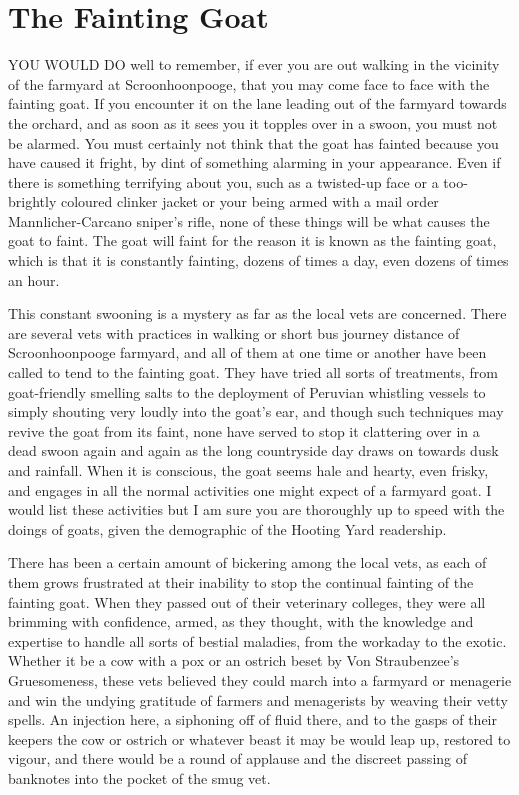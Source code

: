 \chapter{The Fainting Goat}

YOU WOULD DO well to remember, if ever you are out walking in the vicinity of the farmyard at Scroonhoonpooge, that you may come face to face with the fainting goat. If you encounter it on the lane leading out of the farmyard towards the orchard, and as soon as it sees you it topples over in a swoon, you must not be alarmed. You must certainly not think that the goat has fainted because you have caused it fright, by dint of something alarming in your appearance. Even if there is something terrifying about you, such as a twisted-up face or a too-brightly coloured clinker jacket or your being armed with a mail order Mannlicher-Carcano sniper's rifle, none of these things will be what causes the goat to faint. The goat will faint for the reason it is known as the fainting goat, which is that it is constantly fainting, dozens of times a day, even dozens of times an hour.

This constant swooning is a mystery as far as the local vets are concerned. There are several vets with practices in walking or short bus journey distance of Scroonhoonpooge farmyard, and all of them at one time or another have been called to tend to the fainting goat. They have tried all sorts of treatments, from goat-friendly smelling salts to the deployment of Peruvian whistling vessels to simply shouting very loudly into the goat's ear, and though such techniques may revive the goat from its faint, none have served to stop it clattering over in a dead swoon again and again as the long countryside day draws on towards dusk and rainfall. When it is conscious, the goat seems hale and hearty, even frisky, and engages in all the normal activities one might expect of a farmyard goat. I would list these activities but I am sure you are thoroughly up to speed with the doings of goats, given the demographic of the Hooting Yard readership.

There has been a certain amount of bickering among the local vets, as each of them grows frustrated at their inability to stop the continual fainting of the fainting goat. When they passed out of their veterinary colleges, they were all brimming with confidence, armed, as they thought, with the knowledge and expertise to handle all sorts of bestial maladies, from the workaday to the exotic. Whether it be a cow with a pox or an ostrich beset by Von Straubenzee's Gruesomeness, these vets believed they could march into a farmyard or menagerie and win the undying gratitude of farmers and menagerists by weaving their vetty spells. An injection here, a siphoning off of fluid there, and to the gasps of their keepers the cow or ostrich or whatever beast it may be would leap up, restored to vigour, and there would be a round of applause and the discreet passing of banknotes into the pocket of the smug vet.

